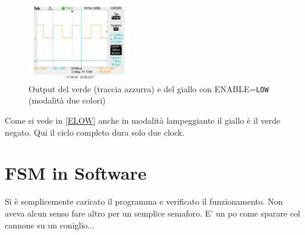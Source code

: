 \documentclass[a4paper,10pt]{article}
\def\code#1{\texttt{#1}}
\begin{document}
\begin{figure}[H]
	\centering
	\includegraphics[width=0.4\textwidth]{../grafici/verde_gialloELOW.png}
	\caption{Output del verde (traccia azzurra) e del giallo con ENABLE=\code{LOW} (modalità due colori)}
	\label{fig:VGELOW}
\end{figure}

Come si vede in \cref{ELOW} anche in modalità lampeggiante il giallo è il verde negato. Qui il ciclo completo dura solo due clock.


\section{FSM in Software}

Si è semplicemente caricato il programma e verificato il funzionamento. Non aveva alcun senso fare altro per un semplice semaforo. E' un po come sparare col cannone su un coniglio...
\end{document}
